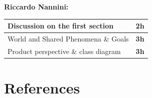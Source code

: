 \documentclass[]{article}
\begin{document}
	\textbf{} \newline
	\textbf{} \newline

	
	\textbf{\large Riccardo Nannini:} \\ \newline
		\begin{tabular}{|l|c|}
			\hline
			Discussion on the first section &  \textbf{2h} \\ \hline
			\rowcolor[HTML]{DCDCDC} 
			World and Shared Phenomena \& Goals & \textbf{3h} \\ \hline
			Product perspective \& class diagram & \textbf{3h} \\ \hline
		\end{tabular}
	
	\section{References}				
	
\end{document}
